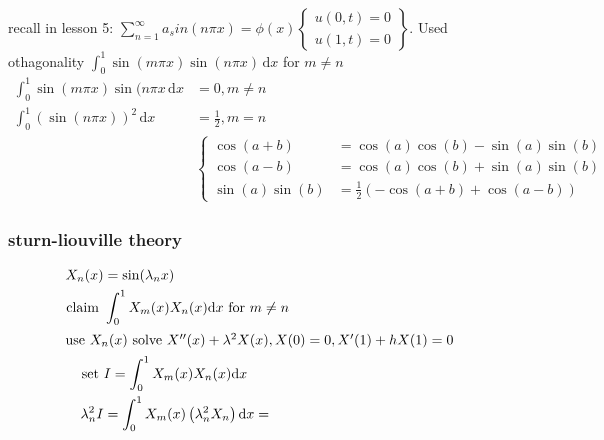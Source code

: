 \documentclass{article}
\begin{document}
recall in lesson 5: $\sum\limits_{n=1}^\infty{a_sin(n\pi x)=\phi(x)}\left\{\begin{aligned}u(0,t)=0\\u(1,t)=0\end{aligned}\right\}$.
Used othagonality $\int_0^1{\sin(m\pi x)\sin(n\pi x)\,\mathrm{d}x}$ for $m\neq n$
\begin{align*}
  \int_0^1{\sin(m\pi x)\sin(n\pi x\,\mathrm{d}x}&=0, m\neq n\\
  \int_0^1{(\sin(n\pi x))^2\,\mathrm{d}x}&=\frac{1}{2}, m=n\\
  &\left\{\begin{aligned}
    \cos(a+b)&=\cos(a)\cos(b)-\sin(a)\sin(b)\\
    \cos(a-b)&=\cos(a)\cos(b)+\sin(a)\sin(b)\\
    \sin(a)\sin(b)&=\frac{1}{2}(-\cos(a+b)+\cos(a-b))
  \end{aligned}\right.
\end{align*}
\subsubsection*{sturn-liouville theory}
\begin{align*}
  X_n(x)&=\sin(\lambda_n x)\\
  \text{claim }&\int_0^1{X_m(x)X_n(x)\mathrm{d}x}\text{ for } m\neq n\\
  \intertext{use $X_n(x)$ solve $X''(x)+\lambda^2X(x), X(0)=0, X'(1)+hX(1)=0$}
  \text{set }& I=\int_0^1{X_m(x)X_n(x)\mathrm{d}x}\\
  \lambda_n^2I&=\int_0^1{X_m(x)\left(\lambda_n^2X_n\right)\mathrm{d}x}=
\end{align*}
\end{document}
